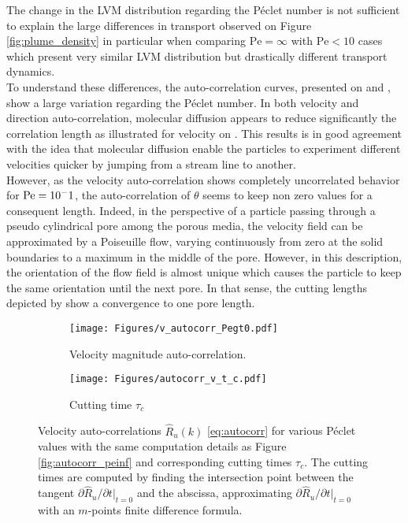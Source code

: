 The change in the LVM distribution regarding the Péclet number is not sufficient to explain the large differences in transport observed on Figure \ref{fig:plume_density} in particular when comparing $\mathrm{Pe}=\infty$ with $\mathrm{Pe}<10$ cases which present very similar LVM distribution but drastically different transport dynamics.\\
To understand these differences, the auto-correlation curves, presented on  and , show a large variation regarding the Péclet number.
In both velocity and direction auto-correlation, molecular diffusion appears to reduce significantly the correlation length as illustrated for velocity on .
This results is in good agreement with the idea that molecular diffusion enable the particles to experiment different velocities quicker by jumping from a stream line to another.\\
However, as the velocity auto-correlation shows completely uncorrelated behavior for $\mathrm{Pe}=10^-1$, the auto-correlation of $\theta$ seems to keep non zero values for a consequent length.
Indeed, in the perspective of a particle passing through a pseudo cylindrical pore among the porous media, the velocity field can be approximated by a Poiseuille flow, varying continuously from zero at the solid boundaries to a maximum in the middle of the pore.
However, in this description, the orientation of the flow field is almost unique which causes the particle to keep the same orientation until the next pore.
In that sense, the cutting lengths depicted by  show a convergence to one pore length.
\begin{figure}[h!]
	\centering
	\begin{subfigure}[b]{0.49\textwidth}
		\centering
		\texttt{[image: Figures/v\_autocorr\_Pegt0.pdf]}
		\caption{Velocity magnitude auto-correlation.}
		\label{fig:autocorrv}
	\end{subfigure}
	\hfill
	\begin{subfigure}[b]{0.49\textwidth}
		\centering
		\texttt{[image: Figures/autocorr\_v\_t\_c.pdf]}
		\caption{Cutting time $\tau_c$}
		\label{fig:autocorr_t_c}
	\end{subfigure}
	\caption{Velocity auto-correlations $\hat{R}_u(k)$ \eqref{eq:autocorr} for various Péclet values with the same computation details as Figure \ref{fig:autocorr_peinf} and corresponding cutting times $\tau_c$. The cutting times are computed by finding the intersection point between the tangent $\partial\hat{R}_u/\partial t|_{t=0}$ and the abscissa, approximating $\partial\hat{R}_u/\partial t|_{t=0}$ with an $m$-points finite difference formula.}
	\label{fig:autocorr}
\end{figure}

